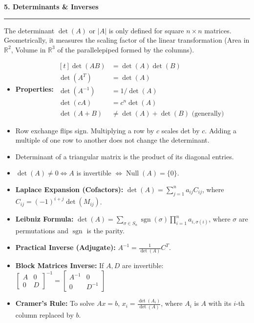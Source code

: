 \documentclass[10pt, landscape, twocolumn]{article}
\newcommand{\cheatsheetsection}[1]{
    \vspace{0.6em}
    {\color{themeblue}\large\bfseries #1} \par
    \vspace{-0.5em}
    {\color{themeblue}\rule{\linewidth}{1pt}} \par
    \vspace{0.2em}
}
\begin{document}
\cheatsheetsection{5. Determinants \& Inverses}
The determinant $\det(A)$ or $|A|$ is only defined for square $n \times n$ matrices. Geometrically, it measures the scaling factor of the linear transformation (Area in $\mathbb{R}^2$, Volume in $\mathbb{R}^3$ of the parallelepiped formed by the columns).
\begin{itemize}[leftmargin=*, itemsep=4pt, parsep=0pt]
    \item \textbf{Properties:}
    $\begin{aligned}[t]
        \det(AB) &= \det(A)\det(B) \\
        \det(A^T) &= \det(A) \\
        \det(A^{-1}) &= 1/\det(A) \\
        \det(cA) &= c^n\det(A) \\
        \det(A+B) &\neq \det(A)+\det(B) \text{ (generally)}
    \end{aligned}$
    \item Row exchange flips sign. Multiplying a row by $c$ scales det by $c$. Adding a multiple of one row to another does not change the determinant.
    \item Determinant of a triangular matrix is the product of its diagonal entries.
    \item $\det(A) \neq 0 \iff A$ is invertible $\iff \operatorname{Null}(A) = \{0\}$.
    \item \textbf{Laplace Expansion (Cofactors):} $\det(A) = \sum_{j=1}^n a_{ij}C_{ij}$, where $C_{ij} = (-1)^{i+j}\det(M_{ij})$.
    \\
    \item \textbf{Leibniz Formula:} $\det(A) = \sum_{\sigma \in S_n} \operatorname{sgn}(\sigma) \prod_{i=1}^n a_{i,\sigma(i)}$, where $\sigma$ are permutations and $\operatorname{sgn}$ is the parity.
    \item \textbf{Practical Inverse (Adjugate):} $A^{-1} = \frac{1}{\det(A)} C^T$.
    \item \textbf{Block Matrices Inverse:} If $A, D$ are invertible:
    $\left[ \begin{smallmatrix} A & 0 \\ 0 & D \end{smallmatrix} \right]^{-1} = \left[ \begin{smallmatrix} A^{-1} & 0 \\ 0 & D^{-1} \end{smallmatrix} \right]$
    \item \textbf{Cramer's Rule:} To solve $Ax=b$, $x_i = \frac{\det(A_i)}{\det(A)}$, where $A_i$ is $A$ with its $i$-th column replaced by $b$.
\end{itemize}
\end{document}
